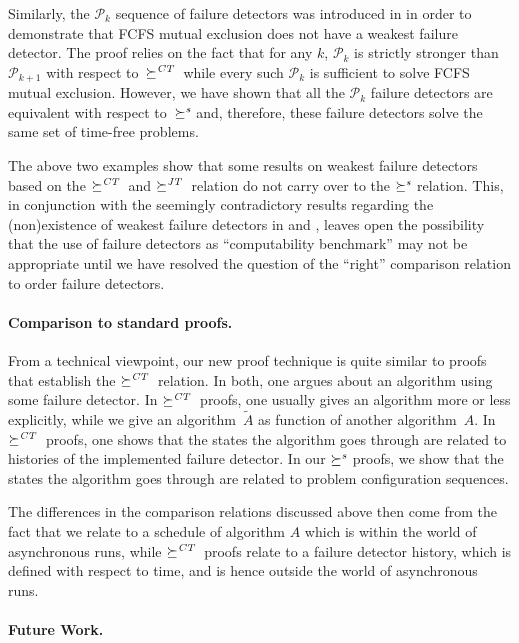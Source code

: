 \documentclass[11pt]{article}
\newcommand{\ident}[1]{\textit{#1}\rule{0cm}{1ex}}
\newcommand{\PFD}{\ensuremath{\mathcal{P}}}
\newcommand{\TrAlg}{\widetilde{A}}
\newcommand{\redCT}{\succeq^\ident{CT}}
\newcommand{\redJT}{\succeq^\ident{JT}}
\newcommand{\redSolv}{\succeq^{\ident{s}}}
\begin{document}
Similarly, the $\PFD_k$ sequence of failure detectors was introduced
     in \cite{bhatt:oteow} in order to demonstrate that FCFS mutual
     exclusion does not have a weakest failure detector.
The proof relies on the fact that for any $k$, $\PFD_k$ is strictly
     stronger than $\PFD_{k+1}$ with  respect to~$\redCT$
     while every such $\PFD_k$ is sufficient to solve FCFS mutual
     exclusion.
However, we have shown that all the $\PFD_k$ failure detectors are
     equivalent with respect to~$\redSolv$ and, therefore, these
     failure detectors solve the same set of time-free problems.


The above two examples show that some results on weakest failure
     detectors based on the $\redCT$ and $\redJT$ relation do not
     carry over to the $\redSolv$ relation.
This, in conjunction with the seemingly contradictory results
     regarding the (non)existence of weakest failure detectors in
     \cite{jayanti:ephawfd} and \cite{bhatt:oteow}, leaves open the
     possibility that the use of failure detectors as ``computability
     benchmark'' \cite{FGK11} may not be appropriate until we have
     resolved the question of the ``right'' comparison relation to
     order failure detectors.


\paragraph{Comparison to standard proofs.}

From a technical viewpoint, our new proof technique is  quite similar
     to proofs that establish the $\redCT$ relation.
In both, one argues about an algorithm using some failure detector.
In $\redCT$ proofs, one usually gives an algorithm more or less
     explicitly, while we give an algorithm~$\TrAlg$ as function of
     another algorithm~$A$.
In $\redCT$ proofs, one shows that the states the algorithm goes
     through are related to histories of the implemented failure
     detector.
In our $\redSolv$ proofs, we show that the states the algorithm goes
     through are related to problem configuration sequences.

The differences in the comparison relations discussed above then come
     from the fact that we relate to a schedule of algorithm $A$ which
     is within the world of asynchronous runs, while $\redCT$ proofs
     relate to a failure detector history, which is defined with
     respect to time, and is hence outside the world of asynchronous
     runs.


\paragraph{Future Work.} 
\end{document}
